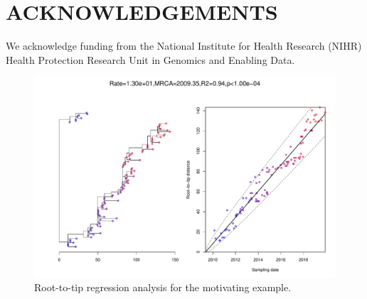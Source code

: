 \documentclass{article}
\begin{document}
\section*{ACKNOWLEDGEMENTS}

We acknowledge funding from the National Institute for Health Research (NIHR) Health Protection Research Unit in Genomics and Enabling Data.

\newpage


%

\newpage
\setcounter{figure}{0}
\setcounter{table}{0}
\makeatletter 
\renewcommand{\thefigure}{S\@arabic\c@figure} 
\renewcommand{\thetable}{S\@arabic\c@table} 
\makeatother

\begin{figure}[t!]
\begin{center}
\includegraphics[width=15cm]{exampleS1.pdf}
\end{center}
\caption{Root-to-tip regression analysis for the motivating example.
\label{fig:exampleS1}}
\end{figure}
\end{document}
